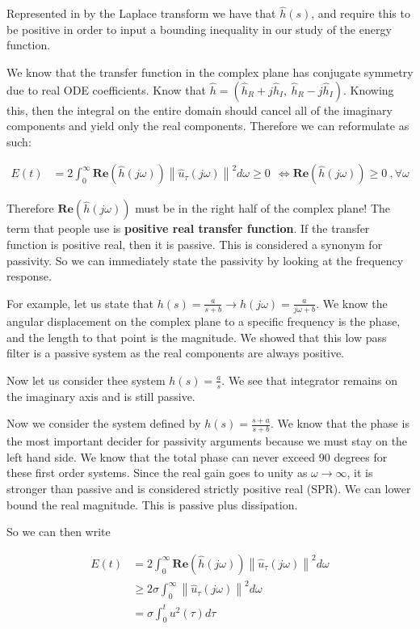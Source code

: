 \documentclass[11pt]{article}
\newcommand{\norm}[1]{\left\lVert#1\right\rVert}
\begin{document}
Represented in by the Laplace transform we have that $\hat{h}(s)$, and require this to be positive in order to input a bounding inequality in our study of the energy function.

We know that the transfer function in the complex plane has conjugate symmetry due to real ODE coefficients. Know that $\hat{h} = (\hat{h}_R + j\hat{h}_I,\ \hat{h}_R - j\hat{h}_I )$. Knowing this, then the integral on the entire domain should cancel all of the imaginary components and yield only the real components. Therefore we can reformulate as such:
 



\begin{align}
	E(t) & = 2 \int_{0}^\infty  \mathbf{Re} (\hat{h}(j\omega)) \norm{\hat{u}_\tau (j\omega)}^2 d\omega \geq 0 \ \ \iff  \mathbf{Re} (\hat{h}(j\omega)) \geq 0 \ , \forall \omega
\end{align}

Therefore $\mathbf{Re} (\hat{h}(j\omega))$ must be in the right half of the complex plane! The term that people use is \textbf{positive real transfer function}. If the transfer function is positive real, then it is passive. This is considered a synonym for passivity. So we can immediately state the passivity by looking at the frequency response.

For example, let us state that $h(s) = \frac{a}{s+b} \rightarrow h(j\omega) = \frac{a}{j\omega+b}$. We know the angular displacement on the complex plane to a specific frequency is the phase, and the length to that point is the magnitude. We showed that this low pass filter is a passive system as the real components are always positive.

Now let us consider thee system $h(s) = \frac{a}{s}$. We see that integrator remains on the imaginary axis and is still passive.

Now we consider the system defined by $h(s) = \frac{s+a}{s+b}$. We know that the phase is the most important decider for passivity arguments because we must stay on the left hand side. We know that the total phase can never exceed 90 degrees for these first order systems. Since the real gain goes to unity as $\omega \rightarrow \infty$, it is stronger than passive and is considered strictly positive real (SPR). We can lower bound the real magnitude. This is passive plus dissipation.

So we can then write


\begin{align}
	E(t) & = 2 \int_{0}^\infty  \mathbf{Re} (\hat{h}(j\omega)) \norm{\hat{u}_\tau (j\omega)}^2 d\omega \\
	& \geq 2\sigma \int_{0}^\infty \norm{\hat{u}_\tau (j\omega)}^2 d\omega \\
	& = \sigma \int_0^t u^2(\tau)d\tau
\end{align}
\end{document}
